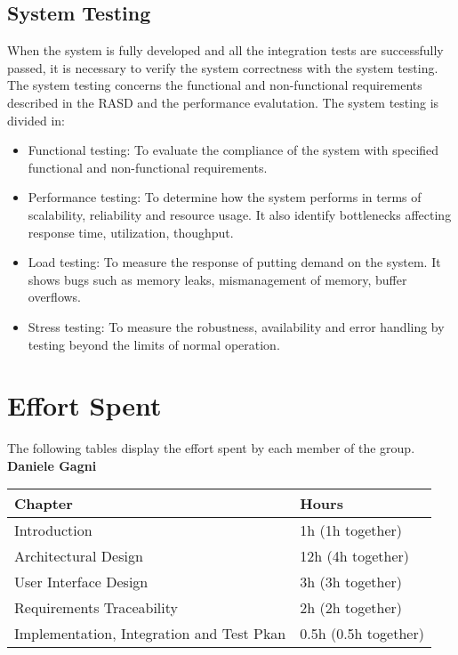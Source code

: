 \documentclass[a4paper, 11pt, titlepage]{article}
\begin{document}
\subsection{System Testing}
When the system is fully developed and all the integration tests are successfully passed, it is
necessary to verify the system correctness with the system testing. The system testing concerns
the functional and non-functional requirements described in the RASD and the performance
evalutation.
The system testing is divided in:
\begin{itemize}
  \item Functional testing: To evaluate the compliance of the system with specified functional
  and non-functional requirements.
  \item Performance testing: To determine how the system performs in terms of scalability, reliability and resource usage. It also identify bottlenecks affecting response time, utilization,
  thoughput.
  \item  Load testing: To measure the response of putting demand on the system. It shows bugs
  such as memory leaks, mismanagement of memory, buffer overflows.
  \item  Stress testing: To measure the robustness, availability and error handling by testing
  beyond the limits of normal operation.
\end{itemize}    


\section{Effort Spent}
The following tables display the effort spent by each member of the group.\\

\textbf{Daniele Gagni}

\begin{tabular}{|l|l|} 
  \hline
  \textbf{Chapter}            & \textbf{Hours}  \\ 
  \hline
  Introduction                & 1h (1h together)             \\ 
  \hline
  Architectural Design         & 12h (4h together)          \\ 
  \hline
  User Interface Design       & 3h (3h together)              \\ 
  \hline
  Requirements Traceability & 2h (2h together)               \\ 
  \hline
  Implementation, Integration and Test Pkan & 0.5h (0.5h together)               \\ 
  \hline
\end{tabular}\\
\end{document}
